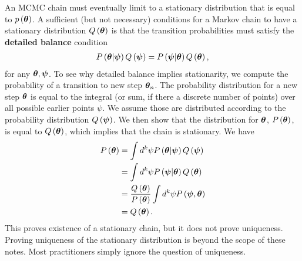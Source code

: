 An MCMC chain must eventually limit to a stationary distribution that is
equal to $p\left({\bm \theta}\right)$.
A sufficient (but not necessary) conditions for a Markov chain to have a 
stationary distribution $Q\left({\bm \theta}\right)$ is that the
transition probabilities must satisfy the \textbf{detailed balance} condition 
\begin{align}
    P\left({\bm \theta}|{\bm \psi}\right)Q\left({\bm \psi}\right)
    =
    P\left({\bm \psi}|{\bm \theta}\right)Q\left({\bm \theta}\right)
    ,
\end{align}
for any ${\bm \theta},{\bm \psi}$. 
To see why detailed balance implies stationarity, we compute the probability
of a transition to new step ${\bm \theta}_n$. 
The probability distribution for a new step ${\bm \theta}$ is equal to the
integral (or sum, if there a discrete number of points)
over all possible earlier points $\psi$.
We assume those are distributed according to the probability distribution
$Q\left({\bm \psi}\right)$. We then show that the distribution for ${\bm \theta}$,
$P\left({\bm \theta}\right)$, is equal to $Q\left({\bm \theta}\right)$, which
implies that the chain is stationary. We have
\begin{align}
    P\left({\bm \theta}\right)
    &=
    \int d^k\psi P\left({\bm \theta}|{\bm \psi}\right) Q\left({\bm \psi}\right)
    \nonumber\\
    &=
    \int d^k\psi P\left({\bm \psi}|{\bm \theta}\right) Q\left({\bm \theta}\right)
    \nonumber\\
    &=
    \frac{Q\left({\bm \theta}\right)}{P\left({\bm \theta}\right)}
    \int d^k\psi P\left({\bm \psi},{\bm \theta}\right)
    \nonumber\\
    &=
    Q\left({\bm \theta}\right)
    .
\end{align}
This proves existence of a stationary chain, but it does not prove uniqueness.
Proving uniqueness of the stationary distribution is beyond the scope of these notes.
Most practitioners simply ignore the question of uniqueness.

